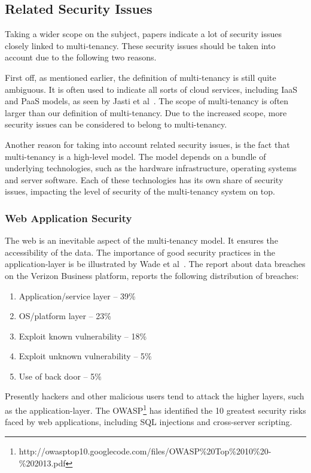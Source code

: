 \subsection{Related Security Issues}
Taking a wider scope on the subject, papers indicate a lot of security issues closely linked to multi-tenancy. 
These security issues should be taken into account due to the following two reasons.

First off, as mentioned earlier, the definition of multi-tenancy is still quite ambiguous. 
It is often used to indicate all sorts of cloud services, including IaaS and PaaS models, as seen by Jasti et al~\cite{Jasti2010Security}. 
The scope of multi-tenancy is often larger than our definition of multi-tenancy. Due to the increased scope, more security issues can be considered to belong to multi-tenancy.

Another reason for taking into account related security issues, is the fact that multi-tenancy is a high-level model. 
The model depends on a bundle of underlying technologies, such as the hardware infrastructure, operating systems and server software. 
Each of these technologies has its own share of security issues, impacting the level of security of the multi-tenancy system on top. 

\subsubsection{Web Application Security}
The web is an inevitable aspect of the multi-tenancy model. 
It ensures the accessibility of the data. 
The importance of good security practices in the application-layer is be illustrated by Wade et al~\cite{Wade2008Security}.
The report about data breaches on the Verizon Business platform, reports the following distribution of breaches:

\begin{enumerate}
    \item Application/service layer – 39\%
    \item OS/platform layer – 23\%
    \item Exploit known vulnerability – 18\%
    \item Exploit unknown vulnerability – 5\%
    \item Use of back door – 5\%
\end{enumerate}

Presently hackers and other malicious users tend to attack the higher layers, such as the application-layer. 
The \ac{OWASP}\footnote{http://owasptop10.googlecode.com/files/OWASP\%20Top\%2010\%20-\%202013.pdf} has identified the 10 greatest security risks faced by web applications, including SQL injections and cross-server scripting.

